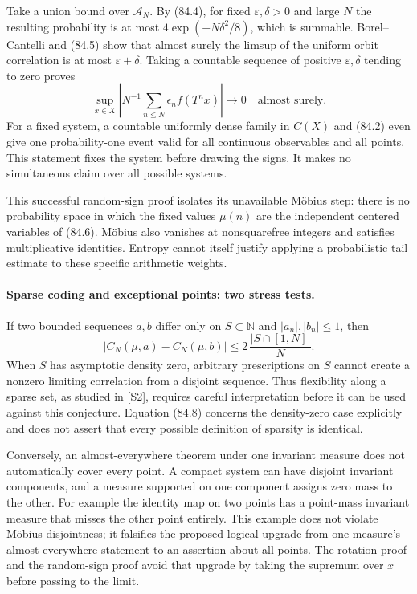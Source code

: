 \documentclass[11pt]{article}
\begin{document}
Take a union bound over $\mathcal A_N$. By (84.4), for fixed
$\varepsilon,\delta>0$ and large $N$ the resulting probability is at most
$4\exp(-N\delta^2/8)$, which is summable. Borel--Cantelli and (84.5)
show that almost surely the limsup of the uniform orbit correlation is
at most $\varepsilon+\delta$. Taking a countable sequence of positive
$\varepsilon,\delta$ tending to zero proves
\[
 \sup_{x\in X}\left|N^{-1}\sum_{n\leq N}\epsilon_n f(T^nx)\right|
                      \longrightarrow0\quad\text{almost surely}.\tag{84.7}
\]
For a fixed system, a countable uniformly dense family in $C(X)$ and
(84.2) even give one probability-one event valid for all continuous
observables and all points. This statement fixes the system before drawing
the signs. It makes no simultaneous claim over all possible systems.

This successful random-sign proof isolates its unavailable Möbius step:
there is no probability space in which the fixed values $\mu(n)$ are the
independent centered variables of (84.6). Möbius also vanishes at
nonsquarefree integers and satisfies multiplicative identities. Entropy
cannot itself justify applying a probabilistic tail estimate to these
specific arithmetic weights.

\paragraph{Sparse coding and exceptional points: two stress tests.}
If two bounded sequences $a,b$ differ only on $S\subset\mathbb N$ and
$|a_n|,|b_n|\leq1$, then
\[
 |C_N(\mu,a)-C_N(\mu,b)|
           \leq2\,\frac{|S\cap[1,N]|}{N}.              \tag{84.8}
\]
When $S$ has asymptotic density zero, arbitrary prescriptions on $S$
cannot create a nonzero limiting correlation from a disjoint sequence.
Thus flexibility along a sparse set, as studied in [S2], requires careful
interpretation before it can be used against this conjecture. Equation
(84.8) concerns the density-zero case explicitly and does not assert that
every possible definition of sparsity is identical.

Conversely, an almost-everywhere theorem under one invariant measure
does not automatically cover every point. A compact system can have
disjoint invariant components, and a measure supported on one component
assigns zero mass to the other. For example the identity map on two
points has a point-mass invariant measure that misses the other point
entirely. This example does not violate Möbius disjointness; it falsifies
the proposed logical upgrade from one measure's almost-everywhere
statement to an assertion about all points. The rotation proof and the
random-sign proof avoid that upgrade by taking the supremum over $x$
before passing to the limit.
\end{document}
